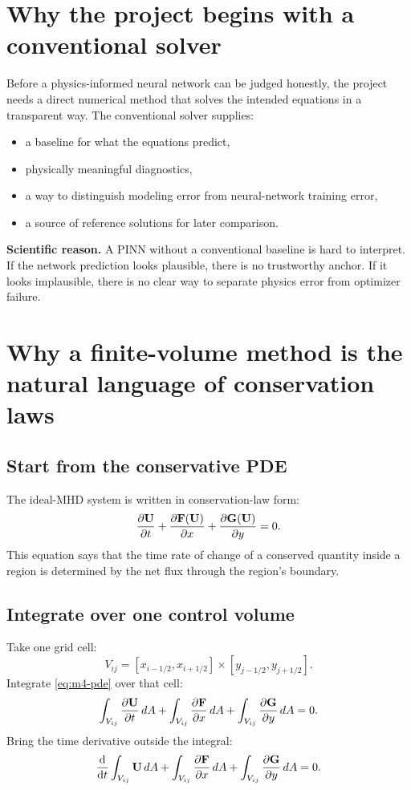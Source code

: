 \documentclass[11pt]{article}
\newcommand{\Uvec}{\mathbf{U}}
\newcommand{\Fvec}{\mathbf{F}}
\newcommand{\Gvec}{\mathbf{G}}
\begin{document}
\section{Why the project begins with a conventional solver}
Before a physics-informed neural network can be judged honestly, the project needs a direct numerical method that solves the intended equations in a transparent way. The conventional solver supplies:
\begin{itemize}[leftmargin=1.8em]
    \item a baseline for what the equations predict,
    \item physically meaningful diagnostics,
    \item a way to distinguish modeling error from neural-network training error,
    \item a source of reference solutions for later comparison.
\end{itemize}

\begin{physicsbox}
\textbf{Scientific reason.} A PINN without a conventional baseline is hard to interpret. If the network prediction looks plausible, there is no trustworthy anchor. If it looks implausible, there is no clear way to separate physics error from optimizer failure.
\end{physicsbox}

\section{Why a finite-volume method is the natural language of conservation laws}

\subsection{Start from the conservative PDE}
The ideal-MHD system is written in conservation-law form:
\begin{equation}
\pdv{\Uvec}{t}
+
\pdv{\Fvec(\Uvec)}{x}
+
\pdv{\Gvec(\Uvec)}{y}
=
0.
\label{eq:m4-pde}
\end{equation}
This equation says that the time rate of change of a conserved quantity inside a region is determined by the net flux through the region's boundary.

\subsection{Integrate over one control volume}
Take one grid cell:
\begin{equation}
V_{ij}=[x_{i-1/2},x_{i+1/2}] \times [y_{j-1/2},y_{j+1/2}].
\end{equation}
Integrate \eqref{eq:m4-pde} over that cell:
\begin{equation}
\int_{V_{ij}}
\pdv{\Uvec}{t}\,dA
+
\int_{V_{ij}}
\pdv{\Fvec}{x}\,dA
+
\int_{V_{ij}}
\pdv{\Gvec}{y}\,dA
=
0.
\label{eq:m4-integral1}
\end{equation}
Bring the time derivative outside the integral:
\begin{equation}
\dv{}{t}
\int_{V_{ij}} \Uvec\,dA
+
\int_{V_{ij}}
\pdv{\Fvec}{x}\,dA
+
\int_{V_{ij}}
\pdv{\Gvec}{y}\,dA
=
0.
\label{eq:m4-integral2}
\end{equation}
\end{document}
